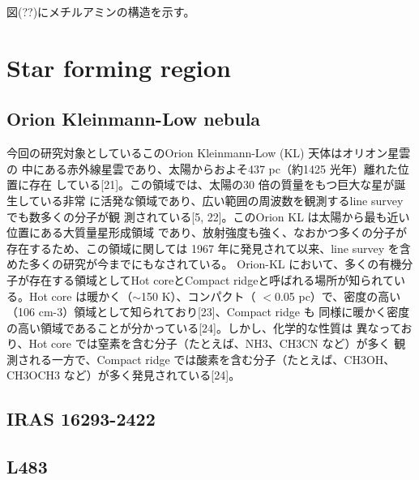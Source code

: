 図(??)にメチルアミンの構造を示す。

\section{Star forming region}
\subsection{Orion Kleinmann-Low nebula}
今回の研究対象としているこのOrion Kleinmann-Low (KL) 天体はオリオン星雲の
中にある赤外線星雲であり、太陽からおよそ437 pc（約1425 光年）離れた位置に存在
している[21]。この領域では、太陽の30 倍の質量をもつ巨大な星が誕生している非常
に活発な領域であり、広い範囲の周波数を観測するline survey でも数多くの分子が観
測されている[5, 22]。このOrion KL は太陽から最も近い位置にある大質量星形成領域
であり、放射強度も強く、なおかつ多くの分子が存在するため、この領域に関しては
1967 年に発見されて以来、line survey を含めた多くの研究が今までにもなされている。
Orion-KL において、多くの有機分子が存在する領域としてHot coreとCompact
ridgeと呼ばれる場所が知られている。Hot core は暖かく（$\sim$150 K）、コンパクト（
$<$0.05 pc）で、密度の高い（106 cm-3）領域として知られており[23]、Compact ridge も
同様に暖かく密度の高い領域であることが分かっている[24]。しかし、化学的な性質は
異なっており、Hot core では窒素を含む分子（たとえば、NH3、CH3CN など）が多く
観測される一方で、Compact ridge では酸素を含む分子（たとえば、CH3OH、CH3OCH3
など）が多く発見されている[24]。

\subsection{IRAS 16293-2422}


\subsection{L483}

